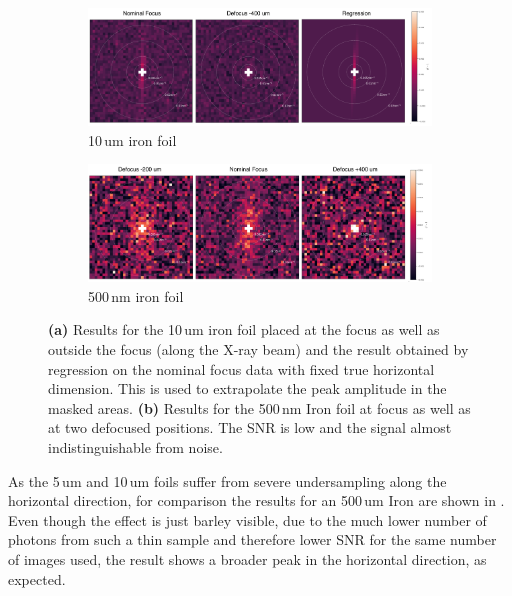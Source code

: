 \begin{figure}
	\centering
	\begin{subfigure}[b]{0.9\textwidth}
		\includegraphics[width=\linewidth]{images/Fe10um_reco2d.pdf}
		\caption{10\,um iron foil}
		\label{fig:fe10umreco2d}
	\end{subfigure}
	\begin{subfigure}[b]{0.9\textwidth}
		\includegraphics[width=\linewidth]{images/Fe500nm_reco2d.pdf}
		\caption{500\,nm iron foil}
		\label{fig:fe500nmreco2d}
	\end{subfigure}
	\caption[Results Iron Foils]{\textbf{(a)} Results for the 10\,um iron foil placed at the focus as well as outside the focus (along the X-ray beam) and the result obtained by regression on the nominal focus data with fixed true horizontal dimension. This is used to extrapolate the peak amplitude in the masked areas. \textbf{(b)} Results for the 500\,nm Iron foil at focus as well as at two defocused positions. The SNR is low and the signal almost indistinguishable from noise.}
	\label{fig:fereco2d}
\end{figure}

As the 5\,um and 10\,um foils suffer from severe undersampling along the horizontal direction, for comparison the results for an 500\,um Iron are shown in . Even though the effect is just barley visible, due to the much lower number of photons from such a thin sample and therefore lower SNR for the same number of images used, the result shows a broader peak in the horizontal direction, as expected.

